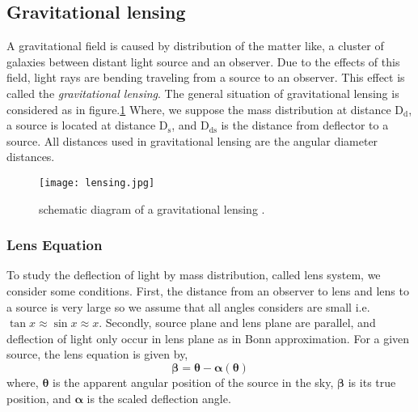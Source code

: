 \subsection{Gravitational lensing}
A gravitational field is caused by distribution of the matter like, a cluster of galaxies between distant light source and an observer. Due to the effects of this field, light rays are bending traveling from a source to an observer. This effect is called the \textit{gravitational lensing}. The general situation of gravitational lensing is considered as in figure.\ref{Fig:lensing} Where, we suppose the mass distribution at distance $ \text{D}_{\text{d}}$, a source is located at distance $ \text{D}_{\text{s}} $, and $ \text{D}_{\text{ds}}$ is the distance from deflector to a source. All distances used in gravitational lensing are the angular diameter distances.
\begin{figure}[H]
	\centering
	\texttt{[image: lensing.jpg]}
	\caption{schematic diagram of a gravitational lensing \cite{manual}.}%
	\label{Fig:lensing}
\end{figure}

\subsubsection{Lens Equation}
To study the deflection of light by mass distribution, called lens system, we consider some conditions. First, the distance from an observer to lens and lens to a source is very large so we assume that all angles considers are small i.e. $\tan x \approx \sin x \approx x$. Secondly, source plane and lens plane are parallel, and deflection of light only occur in lens plane as in Bonn approximation.
For a given source, the lens equation is given by,
\begin{equation}
\pmb\beta =\pmb\theta - \pmb\alpha (\pmb\theta)
\label{LEquation}
\end{equation}
\noindent
where, $\pmb\theta$ is the apparent angular position of the source in the sky, $\pmb\beta$ is its true position, and $\pmb\alpha $ is the scaled deflection angle.



